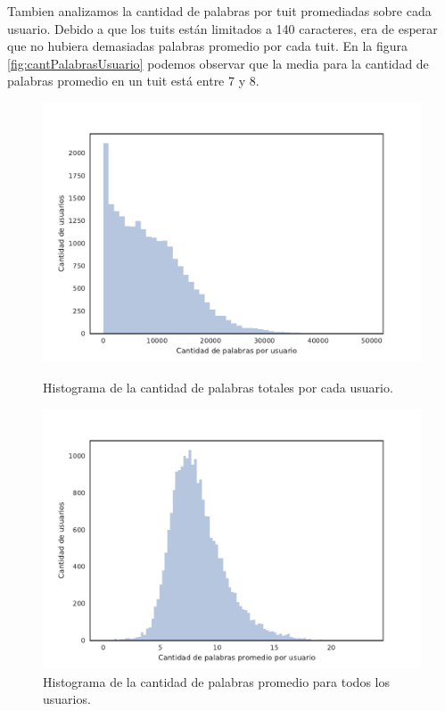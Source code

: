 Tambien analizamos la cantidad de palabras por tuit promediadas sobre cada usuario.
Debido a que los tuits están limitados a 140 caracteres, era de esperar que no hubiera demasiadas palabras promedio por cada tuit. En la figura \ref{fig:cantPalabrasUsuario} podemos observar que la media para la cantidad de palabras promedio en un tuit está entre 7 y 8.
\begin{figure}[!ht]\centering
  \begin{minipage}{0.49\textwidth}
    \includegraphics[width=\linewidth]{./images/train/conFiltro/cantPalabrasUsuario.pdf}
    \caption{Histograma de la cantidad de palabras totales por cada usuario.} 
    \label{fig:cantPalabrasUsuario} 
   \end{minipage}
   \begin{minipage}{0.49\textwidth}
    \includegraphics[width=\linewidth]{./images/train/conFiltro/cantPalabrasPromedio.pdf}
    \caption{Histograma de la cantidad de palabras promedio para todos los usuarios.} 
    \label{fig:cantPalabrasPromedio} 
   \end{minipage}
   
\end{figure}

